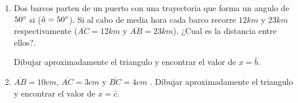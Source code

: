 \documentclass[a4paper,11pt,spanish,sans]{exam}
\begin{document}
\begin{enumerate}
		
		\begin{minipage}{0.65\linewidth}
			\begin{enumerate}
				\item Dos barcos parten de un puerto con una trayectoria que forma un angulo de $50\degree$ si ($\hat{a}=50\degree$). 
				Si al cabo de media hora cada barco recorre $12km$ y $23km$ respectivamente ($\overline{AC}=12km$ y $\overline{AB}=23km$). ¿Cual es la distancia entre ellos?.
				
				Dibujar aproximadamente el triangulo y encontrar el valor de $x= \hat{b}$.
				\item $\overline{AB}=10cm$,  $\overline{AC}=3cm$ y $\overline{BC}=4cm$ . Dibujar aproximadamente el triangulo y encontrar el valor de $x= \hat{c}$.
			\end{enumerate}
		\end{minipage}
				\begin{minipage}{0.3\linewidth}
			
\end{minipage}
\end{enumerate}
\end{document}
